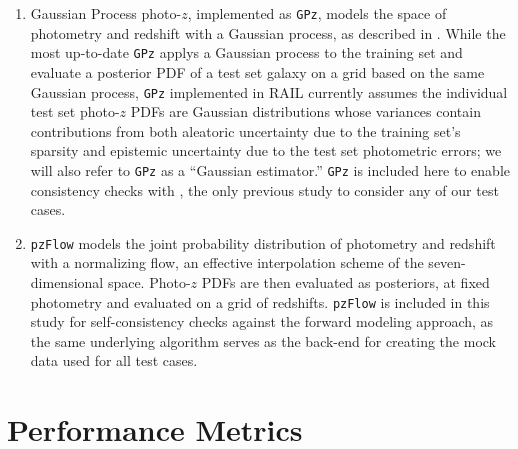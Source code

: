 \documentclass[fleqn,usenatbib,useAMS]{mnras}
\begin{document}
\begin{enumerate}
%
%
\item Gaussian Process photo-$z$, implemented as \texttt{GPz}, models the space of photometry and redshift with a Gaussian process, as described in \citet{Almosallam15, Almosallam16}.
While the most up-to-date \texttt{GPz} applys a Gaussian process to the training set and evaluate a posterior PDF of a test set galaxy on a grid based on the same Gaussian process, \texttt{GPz} implemented in RAIL currently assumes the individual test set photo-$z$ PDFs are Gaussian distributions whose variances contain contributions from both aleatoric uncertainty due to the training set's sparsity and epistemic uncertainty due to the test set photometric errors;
we will also refer to \texttt{GPz} as a ``Gaussian estimator.''
\texttt{GPz} is included here to enable consistency checks with \citet{Stylianou22}, the only previous study to consider any of our test cases.
%
%
\item \texttt{pzFlow} \citep{Crenshaw24} models the joint probability distribution of photometry and redshift with a normalizing flow, an effective interpolation scheme of the seven-dimensional space.
Photo-$z$ PDFs are then evaluated as posteriors, at fixed photometry and evaluated on a grid of redshifts.
\texttt{pzFlow} is included in this study for self-consistency checks against the forward modeling approach, as the same underlying algorithm serves as the back-end for creating the mock data used for all test cases.
\end{enumerate}

\section{Performance Metrics}
\label{sec:metrics}

\end{document}
